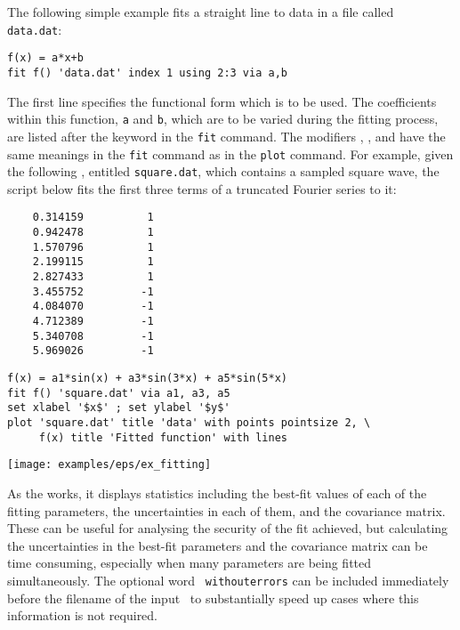 The following simple example fits a straight line to data in a file called {\tt
data.dat}:

\begin{verbatim}
f(x) = a*x+b
fit f() 'data.dat' index 1 using 2:3 via a,b
\end{verbatim}

\noindent The first line specifies the functional form which is to be used.
The coefficients within this function, {\tt a} and {\tt b}, which are to be
varied during the fitting process, are listed after the keyword 
in the {\tt fit} command.  The modifiers , ,
 and  have the same meanings in the {\tt fit}
command as in the {\tt plot} command. For example, given the following
\datafile, entitled {\tt square.dat}, which contains a sampled square wave, the
script below fits the first three terms of a truncated Fourier series to it:

\begin{verbatim}
    0.314159          1
    0.942478          1
    1.570796          1
    2.199115          1
    2.827433          1
    3.455752         -1
    4.084070         -1
    4.712389         -1
    5.340708         -1
    5.969026         -1
\end{verbatim}

\begin{verbatim}
f(x) = a1*sin(x) + a3*sin(3*x) + a5*sin(5*x)
fit f() 'square.dat' via a1, a3, a5
set xlabel '$x$' ; set ylabel '$y$'
plot 'square.dat' title 'data' with points pointsize 2, \
     f(x) title 'Fitted function' with lines
\end{verbatim}

\begin{center}
\texttt{[image: examples/eps/ex\_fitting]}
\end{center}

As the  works, it displays statistics including the best-fit
values of each of the fitting parameters, the uncertainties in each of them,
and the covariance matrix. These can be useful for analysing the security of
the fit achieved, but calculating the uncertainties in the best-fit parameters
and the covariance matrix can be time consuming, especially when many
parameters are being fitted simultaneously. The optional word {\tt
withouterrors} can be included immediately before the filename of the input
\datafile\ to substantially speed up cases where this information is not
required.


